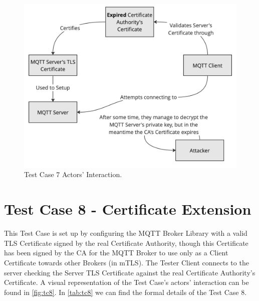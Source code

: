 \documentclass[binding=0.6cm,noexaminfo]{sapthesis}
\begin{document}
\begin{figure}[htb]
	\includegraphics[width=14cm]{TC7}
	\caption{Test Case 7 Actors' Interaction.}
	\label{fig:tc7}
\end{figure}

\section{Test Case 8 - Certificate Extension}
This Test Case is set up by configuring the MQTT Broker Library with a valid TLS Certificate signed by the real Certificate Authority, though this Certificate has been signed by the CA for the MQTT Broker to use only as a Client Certificate towards other Brokers (in mTLS). The Tester Client connects to the server checking the Server TLS Certificate against the real Certificate Authority’s Certificate. A visual representation of the Test Case's actors' interaction can be found in \autoref{fig:tc8}.  In \autoref{tab:tc8} we can find the formal details of the Test Case 8.
\end{document}
